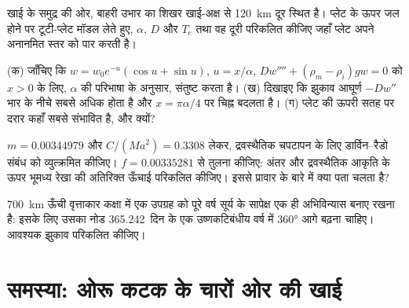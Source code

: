 \begin{exercise}[$\star\star$]\label{exo:b3:gravity-geodesy:9}
खाई के समुद्र की ओर, बाहरी उभार का शिखर खाई-अक्ष से
\qty{120}{km} दूर स्थित है। प्लेट के ऊपर जल होने पर टूटी-प्लेट मॉडल लेते हुए,
$\alpha$, $D$ और $T_e$ तथा वह दूरी परिकलित कीजिए जहाँ प्लेट
अपने अनानमित स्तर को पार करती है।
\end{exercise}

\begin{exercise}[$\star\star\star$]\label{exo:b3:gravity-geodesy:10}
(क) जाँचिए कि $w = w_0e^{-u}(\cos u + \sin u)$, $u = x/\alpha$,
$Dw'''' + (\rho_m - \rho_i)gw = 0$ को $x > 0$ के लिए, $\alpha$ की परिभाषा के अनुसार, संतुष्ट करता है।
(ख) दिखाइए कि झुकाव आघूर्ण $-Dw''$ भार के नीचे सबसे अधिक होता है और
$x = \pi\alpha/4$ पर चिह्न बदलता है। (ग) प्लेट की ऊपरी सतह पर दरार
कहाँ सबसे संभावित है, और क्यों?
\end{exercise}

\begin{exercise}[$\star\star\star$]\label{exo:b3:gravity-geodesy:11}
$m = \num{0.00344979}$ और $C/(Ma^2) = \num{0.3308}$ लेकर, द्रवस्थैतिक चपटापन के लिए
डार्विन--रैडो संबंध को व्युत्क्रमित कीजिए।
$f = \num{0.00335281}$ से तुलना कीजिए: अंतर और द्रवस्थैतिक आकृति के ऊपर
भूमध्य रेखा की अतिरिक्त ऊँचाई परिकलित कीजिए। इससे प्रावार के बारे में क्या पता चलता है?
\end{exercise}

\begin{exercise}[$\star\star\star$]\label{exo:b3:gravity-geodesy:12}
\qty{700}{km} ऊँची वृत्ताकार कक्षा में एक उपग्रह को पूरे वर्ष सूर्य के सापेक्ष
एक ही अभिविन्यास बनाए रखना है: इसके लिए उसका नोड
\num{365.242}~दिन के एक उष्णकटिबंधीय वर्ष में \ang{360} आगे बढ़ना चाहिए। आवश्यक झुकाव परिकलित कीजिए।
\end{exercise}

\section{समस्या: ओरू कटक के चारों ओर की खाई}


